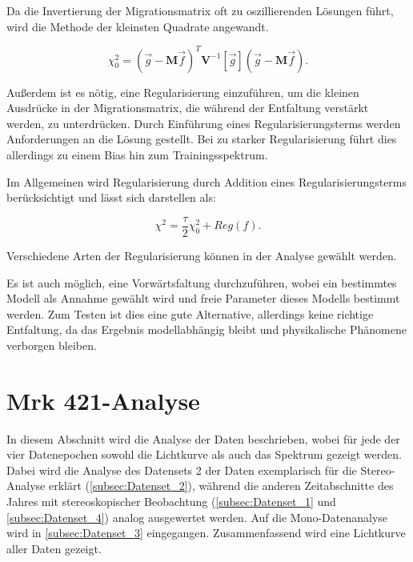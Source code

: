 Da die Invertierung der Migrationsmatrix oft zu oszillierenden Lösungen führt, wird die Methode der kleinsten Quadrate angewandt.

\begin{equation}
 \chi_0^2=(\vec{g}-\mathbf{M}\vec{f})^T \mathbf{V}^{-1}[\vec{g}](\vec{g}-\mathbf{M}\vec{f}).
\end{equation}

% 

Außerdem ist es nötig, eine Regularisierung einzuführen, um die kleinen Ausdrücke in der Migrationsmatrix, die während der Entfaltung verstärkt werden, zu unterdrücken.
Durch Einführung eines Regularisierungsterms werden Anforderungen an die Lösung gestellt.
Bei zu starker Regularisierung führt dies allerdings zu einem Bias hin zum Trainingsspektrum.

Im Allgemeinen wird Regularisierung durch Addition eines Regularisierungsterms berücksichtigt und lässt sich darstellen als:

\begin{equation}
 \chi^2=\frac{\tau}{2}\chi_0^2 + Reg(f).
\end{equation}

Verschiedene Arten der Regularisierung können in der Analyse gewählt werden.\cite{CombUnfold}

Es ist auch möglich, eine Vorwärtsfaltung durchzuführen, wobei ein bestimmtes Modell als Annahme gewählt wird und freie Parameter dieses Modells bestimmt werden.\cite{CombUnfold}
Zum Testen ist dies eine gute Alternative, allerdings keine richtige Entfaltung, da das Ergebnis modellabhängig bleibt und physikalische Phänomene verborgen bleiben.

\section{Mrk 421-Analyse}
\label{Mrk421_Analyse}
In diesem Abschnitt wird die Analyse der Daten beschrieben, wobei für jede der vier Datenepochen sowohl die Lichtkurve als auch das Spektrum gezeigt werden.
Dabei wird die Analyse des Datensets 2 der Daten exemplarisch für die Stereo-Analyse erklärt (\autoref{subsec:Datenset_2}), während die anderen Zeitabschnitte des Jahres mit stereoskopischer Beobachtung (\autoref{subsec:Datenset_1} und \autoref{subsec:Datenset_4}) analog ausgewertet werden.
Auf die Mono-Datenanalyse wird in \autoref{subsec:Datenset_3} eingegangen.
Zusammenfassend wird eine Lichtkurve aller Daten gezeigt.



